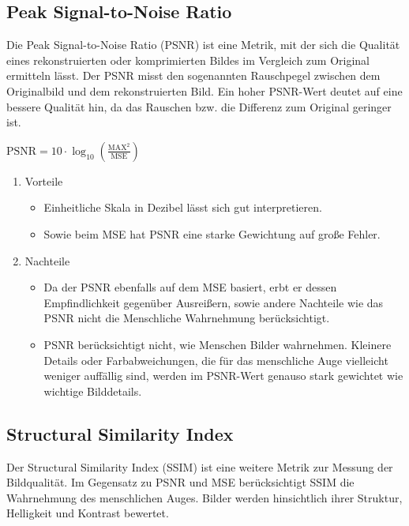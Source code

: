 \newpage
        \subsection{Peak Signal-to-Noise Ratio}
            Die Peak Signal-to-Noise Ratio (PSNR) ist eine Metrik, mit der sich die Qualität eines rekonstruierten oder komprimierten Bildes im Vergleich zum Original ermitteln lässt.
            Der PSNR misst den sogenannten Rauschpegel zwischen dem Originalbild und dem rekonstruierten Bild.
            Ein hoher PSNR-Wert deutet auf eine bessere Qualität hin, da das Rauschen bzw. die Differenz zum Original geringer ist.
            \cite{psnr, psnr2}
            \begin{center}
                $\text{PSNR} = 10 \cdot \log_{10} \left( \frac{\text{MAX}^2}{\text{MSE}} \right)$
            \end{center}
            \begin{enumerate}
                \item Vorteile
                \begin{itemize}
                    \item Einheitliche Skala in Dezibel lässt sich gut interpretieren.\cite{psnr3}
                    \item Sowie beim MSE hat PSNR eine starke Gewichtung auf große Fehler.
                \end{itemize}
                \item Nachteile
                \begin{itemize}
                    \item Da der PSNR ebenfalls auf dem MSE basiert, erbt er dessen Empfindlichkeit gegenüber Ausreißern, sowie andere Nachteile wie das PSNR nicht die Menschliche Wahrnehmung berücksichtigt.
                    \item PSNR berücksichtigt nicht, wie Menschen Bilder wahrnehmen. Kleinere Details oder Farbabweichungen, die für das menschliche Auge vielleicht weniger auffällig sind, werden im PSNR-Wert genauso stark gewichtet wie wichtige Bilddetails.\cite{mse_psnr_eye}
                \end{itemize}
            \end{enumerate}

\newpage
        \subsection{Structural Similarity Index}
            \cite{ssim_paper}
            Der Structural Similarity Index (SSIM) ist eine weitere Metrik zur Messung der Bildqualität. Im Gegensatz zu PSNR und MSE berücksichtigt SSIM die Wahrnehmung des menschlichen Auges.
            Bilder werden hinsichtlich ihrer Struktur, Helligkeit und Kontrast bewertet.
            
